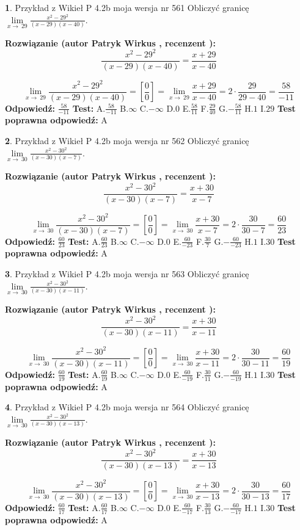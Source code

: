 \documentclass[12pt, a4paper]{article}
\theoremstyle{definition} %
\newtheorem{zad}{}
\newcommand{\zadStart}[1]{\begin{zad}#1\newline}
\newcommand{\zadStop}{\end{zad}}
\newcommand{\rozwStart}[2]{\noindent \textbf{Rozwiązanie (autor #1 , recenzent #2): }\newline}
\newcommand{\rozwStop}{\newline}
\newcommand{\odpStart}{\noindent \textbf{Odpowiedź:}\newline}
\newcommand{\odpStop}{\newline}
\newcommand{\testStart}{\noindent \textbf{Test:}\newline}
\newcommand{\testStop}{\newline}
\newcommand{\kluczStart}{\noindent \textbf{Test poprawna odpowiedź:}\newline}
\newcommand{\kluczStop}{\newline}
\begin{document}
\zadStart{Przykład z Wikieł P 4.2b moja wersja nr 561}
Obliczyć granicę $\lim\limits_{x\to\ 29}\frac{x^{2}-29^{2}}{(x-29)(x-40)}$.
\zadStop
\rozwStart{Patryk Wirkus}{}
$$\frac{x^{2}-29^{2}}{(x-29)(x-40)}=\frac{x+29}{x-40}$$

$$\lim\limits_{x\to\ 29}\frac{x^{2}-29^{2}}{(x-29)(x-40)}=[\frac{0}{0}]=\lim\limits_{x\to\ 29}\frac{x+29}{x-40}=2 \cdot \frac{29}{29-40} = \frac{58}{-11}$$
\rozwStop
\odpStart
$\frac{58}{-11}$
\odpStop
\testStart
A.$\frac{58}{-11}$
B.$\infty$
C.$-\infty$
D.$0$
E.$\frac{58}{11}$
F.$\frac{29}{40}$
G.$-\frac{58}{11}$
H.$1$
I.$29$
\testStop
\kluczStart
A
\kluczStop



\zadStart{Przykład z Wikieł P 4.2b moja wersja nr 562}
Obliczyć granicę $\lim\limits_{x\to\ 30}\frac{x^{2}-30^{2}}{(x-30)(x-7)}$.
\zadStop
\rozwStart{Patryk Wirkus}{}
$$\frac{x^{2}-30^{2}}{(x-30)(x-7)}=\frac{x+30}{x-7}$$

$$\lim\limits_{x\to\ 30}\frac{x^{2}-30^{2}}{(x-30)(x-7)}=[\frac{0}{0}]=\lim\limits_{x\to\ 30}\frac{x+30}{x-7}=2 \cdot \frac{30}{30-7} = \frac{60}{23}$$
\rozwStop
\odpStart
$\frac{60}{23}$
\odpStop
\testStart
A.$\frac{60}{23}$
B.$\infty$
C.$-\infty$
D.$0$
E.$\frac{60}{-23}$
F.$\frac{30}{7}$
G.$-\frac{60}{-23}$
H.$1$
I.$30$
\testStop
\kluczStart
A
\kluczStop



\zadStart{Przykład z Wikieł P 4.2b moja wersja nr 563}
Obliczyć granicę $\lim\limits_{x\to\ 30}\frac{x^{2}-30^{2}}{(x-30)(x-11)}$.
\zadStop
\rozwStart{Patryk Wirkus}{}
$$\frac{x^{2}-30^{2}}{(x-30)(x-11)}=\frac{x+30}{x-11}$$

$$\lim\limits_{x\to\ 30}\frac{x^{2}-30^{2}}{(x-30)(x-11)}=[\frac{0}{0}]=\lim\limits_{x\to\ 30}\frac{x+30}{x-11}=2 \cdot \frac{30}{30-11} = \frac{60}{19}$$
\rozwStop
\odpStart
$\frac{60}{19}$
\odpStop
\testStart
A.$\frac{60}{19}$
B.$\infty$
C.$-\infty$
D.$0$
E.$\frac{60}{-19}$
F.$\frac{30}{11}$
G.$-\frac{60}{-19}$
H.$1$
I.$30$
\testStop
\kluczStart
A
\kluczStop



\zadStart{Przykład z Wikieł P 4.2b moja wersja nr 564}
Obliczyć granicę $\lim\limits_{x\to\ 30}\frac{x^{2}-30^{2}}{(x-30)(x-13)}$.
\zadStop
\rozwStart{Patryk Wirkus}{}
$$\frac{x^{2}-30^{2}}{(x-30)(x-13)}=\frac{x+30}{x-13}$$

$$\lim\limits_{x\to\ 30}\frac{x^{2}-30^{2}}{(x-30)(x-13)}=[\frac{0}{0}]=\lim\limits_{x\to\ 30}\frac{x+30}{x-13}=2 \cdot \frac{30}{30-13} = \frac{60}{17}$$
\rozwStop
\odpStart
$\frac{60}{17}$
\odpStop
\testStart
A.$\frac{60}{17}$
B.$\infty$
C.$-\infty$
D.$0$
E.$\frac{60}{-17}$
F.$\frac{30}{13}$
G.$-\frac{60}{-17}$
H.$1$
I.$30$
\testStop
\kluczStart
A
\kluczStop
\end{document}

